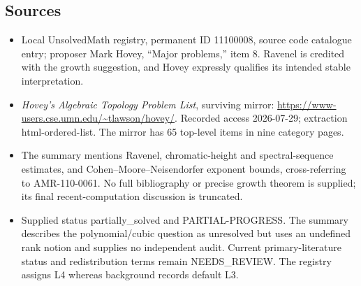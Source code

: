 \documentclass[11pt]{article}
\begin{document}
\subsection{Sources}
\begin{itemize}
\item Local UnsolvedMath registry, permanent ID 11100008, source code catalogue entry; proposer Mark Hovey, ``Major problems,'' item 8. Ravenel is credited with the growth suggestion, and Hovey expressly qualifies its intended stable interpretation.
\item \emph{Hovey's Algebraic Topology Problem List}, surviving mirror: \url{https://www-users.cse.umn.edu/~tlawson/hovey/}. Recorded access 2026-07-29; extraction html-ordered-list. The mirror has 65 top-level items in nine category pages.
\item The summary mentions Ravenel, chromatic-height and spectral-sequence estimates, and Cohen--Moore--Neisendorfer exponent bounds, cross-referring to AMR-110-0061. No full bibliography or precise growth theorem is supplied; its final recent-computation discussion is truncated.
\item Supplied status partially\_solved and PARTIAL-PROGRESS. The summary describes the polynomial/cubic question as unresolved but uses an undefined rank notion and supplies no independent audit. Current primary-literature status and redistribution terms remain NEEDS\_REVIEW. The registry assigns L4 whereas background records default L3.
\end{itemize}
\end{document}
